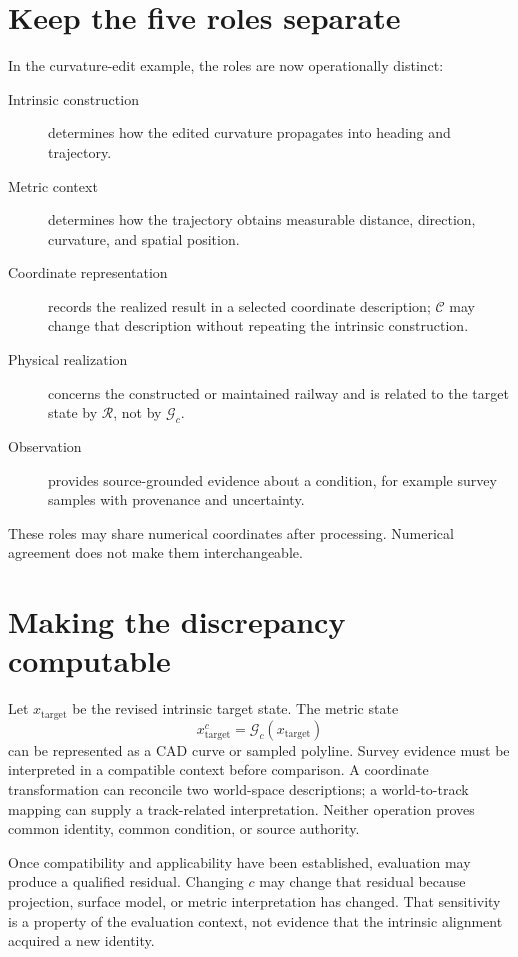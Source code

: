 \section{Keep the five roles separate}

In the curvature-edit example, the roles are now operationally distinct:

\begin{description}
\item[Intrinsic construction] determines how the edited curvature
  propagates into heading and trajectory.
\item[Metric context] determines how the trajectory obtains measurable
  distance, direction, curvature, and spatial position.
\item[Coordinate representation] records the realized result in a
  selected coordinate description; \(\mathcal C\) may change that
  description without repeating the intrinsic construction.
\item[Physical realization] concerns the constructed or maintained
  railway and is related to the target state by \(\mathcal R\), not by
  \(\mathcal G_c\).
\item[Observation] provides source-grounded evidence about a condition,
  for example survey samples with provenance and uncertainty.
\end{description}

These roles may share numerical coordinates after processing. Numerical
agreement does not make them interchangeable.

\section{Making the discrepancy computable}

Let \(x_{\mathrm{target}}\) be the revised intrinsic target state. The
metric state
\[
x_{\mathrm{target}}^{c}=\mathcal G_c(x_{\mathrm{target}})
\]
can be represented as a CAD curve or sampled polyline. Survey evidence
must be interpreted in a compatible context before comparison. A
coordinate transformation can reconcile two world-space descriptions;
a world-to-track mapping can supply a track-related interpretation.
Neither operation proves common identity, common condition, or source
authority.

Once compatibility and applicability have been established, evaluation
may produce a qualified residual. Changing \(c\) may change that
residual because projection, surface model, or metric interpretation has
changed. That sensitivity is a property of the evaluation context, not
evidence that the intrinsic alignment acquired a new identity.

